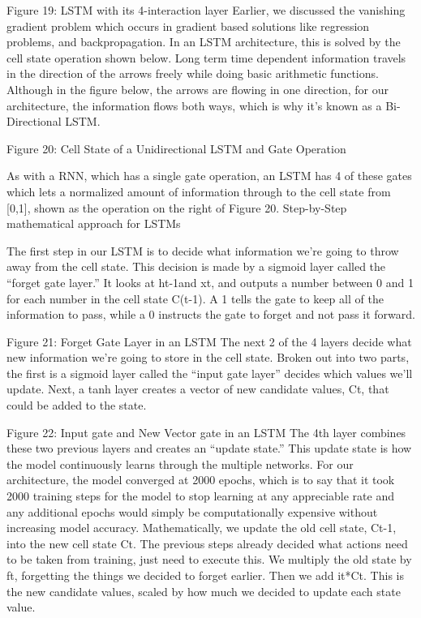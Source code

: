 \documentclass{article}
\begin{document}
Figure 19: LSTM with its 4-interaction layer
Earlier, we discussed the vanishing gradient problem which occurs in gradient based solutions like regression problems, and backpropagation. In an LSTM architecture, this is solved by the cell state operation shown below. Long term time dependent information travels in the direction of the arrows freely while doing basic arithmetic functions. Although in the figure below, the arrows are flowing in one direction, for our architecture, the information flows both ways, which is why it’s known as a Bi-Directional LSTM.

Figure 20: Cell State of a Unidirectional LSTM and Gate Operation

As with a RNN, which has a single gate operation, an LSTM has 4 of these gates which lets a normalized amount of information through to the cell state from [0,1], shown as the operation on the right of Figure 20. 
Step-by-Step mathematical approach for LSTMs

The first step in our LSTM is to decide what information we're going to throw away from the cell state. This decision is made by a sigmoid layer called the ``forget gate layer.'' It looks at ht-1and xt, and outputs a number between 0 and 1 for each number in the cell state C(t-1). A 1 tells the gate to keep all of the information to pass, while a 0 instructs the gate to forget and not pass it forward. 

Figure 21: Forget Gate Layer in an LSTM
The next 2 of the 4 layers decide what new information we're going to store in the cell state. Broken out into two parts, the first is a sigmoid layer called the ``input gate layer'' decides which values we'll update. Next, a tanh layer creates a vector of new candidate values, Ct, that could be added to the state. 

Figure 22: Input gate and New Vector gate in an LSTM
The 4th layer combines these two previous layers and creates an ``update state.'' This update state is how the model continuously learns through the multiple networks. For our architecture, the model converged at 2000 epochs, which is to say that it took 2000 training steps for the model to stop learning at any appreciable rate and any additional epochs would simply be computationally expensive without increasing model accuracy. Mathematically, we update the old cell state, Ct-1, into the new cell state Ct. The previous steps already decided what actions need to be taken from training, just need to execute this. We multiply the old state by ft, forgetting the things we decided to forget earlier. Then we add it*Ct. This is the new candidate values, scaled by how much we decided to update each state value.
\end{document}

